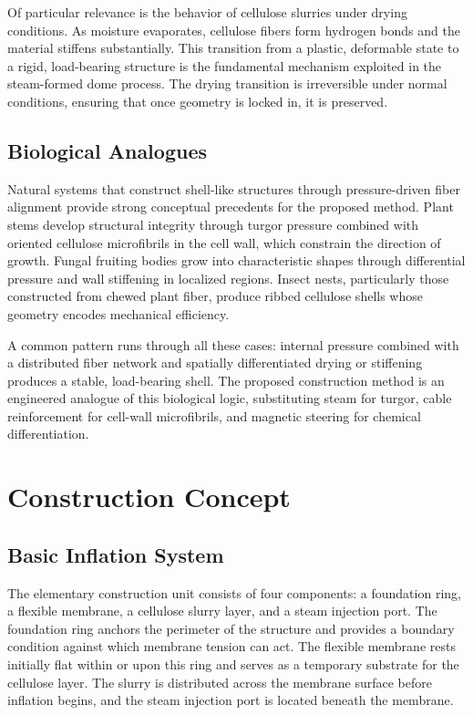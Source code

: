 \documentclass[12pt,a4paper]{article}
\begin{document}
Of particular relevance is the behavior of cellulose slurries under
drying conditions. As moisture evaporates, cellulose fibers form
hydrogen bonds and the material stiffens substantially. This transition
from a plastic, deformable state to a rigid, load-bearing structure
is the fundamental mechanism exploited in the steam-formed dome process.
The drying transition is irreversible under normal conditions, ensuring
that once geometry is locked in, it is preserved.

\subsection{Biological Analogues}

Natural systems that construct shell-like structures through
pressure-driven fiber alignment provide strong conceptual precedents for
the proposed method. Plant stems develop structural integrity through
turgor pressure combined with oriented cellulose microfibrils in the
cell wall, which constrain the direction of growth. Fungal fruiting
bodies grow into characteristic shapes through differential pressure
and wall stiffening in localized regions. Insect nests, particularly
those constructed from chewed plant fiber, produce ribbed cellulose
shells whose geometry encodes mechanical efficiency.

A common pattern runs through all these cases: internal pressure
combined with a distributed fiber network and spatially differentiated
drying or stiffening produces a stable, load-bearing shell. The
proposed construction method is an engineered analogue of this
biological logic, substituting steam for turgor, cable reinforcement
for cell-wall microfibrils, and magnetic steering for chemical
differentiation.

\section{Construction Concept}

\subsection{Basic Inflation System}

The elementary construction unit consists of four components: a
foundation ring, a flexible membrane, a cellulose slurry layer, and a
steam injection port. The foundation ring anchors the perimeter of the
structure and provides a boundary condition against which membrane
tension can act. The flexible membrane rests initially flat within or
upon this ring and serves as a temporary substrate for the cellulose
layer. The slurry is distributed across the membrane surface before
inflation begins, and the steam injection port is located beneath the
membrane.
\end{document}
